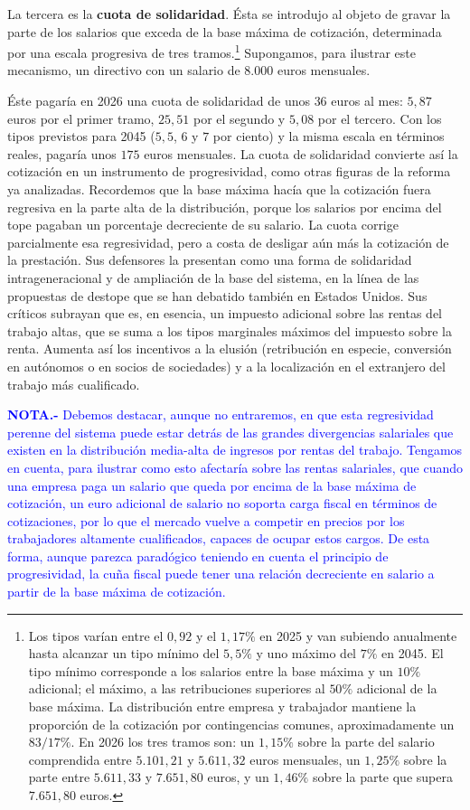 \documentclass[10pt,a4paper]{article}
\begin{document}
La tercera es la \textbf{cuota de solidaridad}. Ésta se introdujo al objeto de gravar la parte de los salarios que exceda de la base máxima de cotización, determinada por una escala progresiva de tres tramos.\footnote{Los tipos varían entre el $0,92$ y el $1,17\%$ en 2025 y van subiendo anualmente hasta alcanzar un tipo mínimo del $5,5\%$ y uno máximo del $7\%$ en 2045. El tipo mínimo corresponde a los salarios entre la base máxima y un $10\%$ adicional; el máximo, a las retribuciones superiores al $50\%$ adicional de la base máxima. La distribución entre empresa y trabajador mantiene la proporción de la cotización por contingencias comunes, aproximadamente un $83/17\%$. En 2026 los tres tramos son: un $1,15\%$ sobre la parte del salario comprendida entre $5.101,21$ y $5.611,32$ euros mensuales, un $1,25\%$ sobre la parte entre $5.611,33$ y $7.651,80$ euros, y un $1,46\%$ sobre la parte que supera $7.651,80$ euros.
} Supongamos, para ilustrar este mecanismo, un directivo con un salario de $8.000$ euros mensuales. 

Éste pagaría en 2026 una cuota de solidaridad de unos $36$ euros al mes: $5,87$ euros por el primer tramo, $25,51$ por el segundo y $5,08$ por el tercero. Con los tipos previstos para 2045 ($5,5$, $6$ y $7$ por ciento) y la misma escala en términos reales, pagaría unos $175$ euros mensuales. La cuota de solidaridad convierte así la cotización en un instrumento de progresividad, como otras figuras de la reforma ya analizadas. Recordemos que la base máxima hacía que la cotización fuera regresiva en la parte alta de la distribución, porque los salarios por encima del tope pagaban un porcentaje decreciente de su salario. La cuota corrige parcialmente esa regresividad, pero a costa de desligar aún más la cotización de la prestación. Sus defensores la presentan como una forma de solidaridad intrageneracional y de ampliación de la base del sistema, en la línea de las propuestas de destope que se han debatido también en Estados Unidos. Sus críticos subrayan que es, en esencia, un impuesto adicional sobre las rentas del trabajo altas, que se suma a los tipos marginales máximos del impuesto sobre la renta. Aumenta así los incentivos a la elusión (retribución en especie, conversión en autónomos o en socios de sociedades) y a la localización en el extranjero del trabajo más cualificado.

\textcolor{blue}{\textbf{NOTA.-} Debemos destacar, aunque no entraremos, en que esta regresividad perenne del sistema puede estar detrás de las grandes divergencias salariales que existen en la distribución media-alta de ingresos por rentas del trabajo. Tengamos en cuenta, para ilustrar como esto afectaría sobre las rentas salariales, que cuando una empresa paga un salario que queda por encima de la base máxima de cotización, un euro adicional de salario no soporta carga fiscal en términos de cotizaciones, por lo que el mercado vuelve a competir en precios por los trabajadores altamente cualificados, capaces de ocupar estos cargos. De esta forma, aunque parezca paradógico teniendo en cuenta el principio de progresividad, la cuña fiscal puede tener una relación decreciente en salario a partir de la base máxima de cotización.} 
\end{document}
